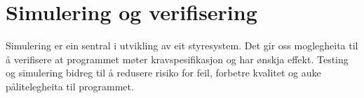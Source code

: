 \chapter{Simulering og verifisering}
\thispagestyle{fancy}

Simulering er ein sentral i utvikling av eit styresystem.
Det gir oss moglegheita til å verifisere at programmet møter kravspesifikasjon og har ønskja effekt.
Testing og simulering bidreg til å redusere risiko for feil, forbetre kvalitet og auke pålitelegheita til programmet.



